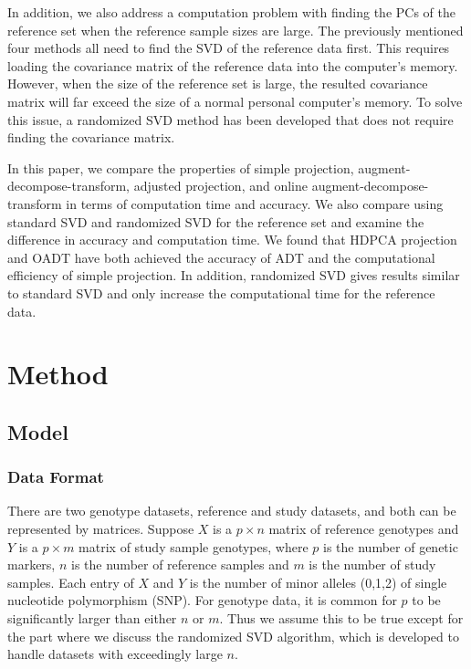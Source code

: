 \documentclass{article}
\begin{document}
In addition, we also address a computation problem with finding the PCs of the reference set when the reference sample sizes are large. 
The previously mentioned four methods all need to find the SVD of the reference data first.
This requires loading the covariance matrix of the reference data into the
computer's memory. 
However, when the size of the reference set is large,
the resulted covariance matrix will far exceed the size of a normal personal
computer's memory.
To solve this issue, a randomized SVD method has been developed that does not
require finding the covariance matrix.

In this paper, we compare the properties of
simple projection, augment-decompose-transform, adjusted projection, and online augment-decompose-transform
in terms of computation time and accuracy.
We also compare using standard SVD and randomized SVD for the reference set
and examine the difference in accuracy and computation time.
We found that HDPCA projection and OADT have both achieved the accuracy of ADT
and the computational efficiency of simple projection.
In addition, randomized SVD gives results similar to standard SVD and only increase the computational time for the reference data.




\section{Method}

\subsection{Model}

\subsubsection{Data Format}
There are two genotype datasets, reference and study datasets, and both can be represented by matrices.
Suppose $X$ is a $p \times n$ matrix of reference genotypes and 
$Y$ is a $p \times m$ matrix of study sample genotypes, where 
$p$ is the number of genetic markers, $n$ is the number of reference samples and $m$ is the number of study samples. Each entry of $X$ and $Y$ is the number of minor alleles (0,1,2) of single nucleotide polymorphism (SNP). 
For genotype data, it is common for $p$ to be significantly larger than either $n$ or $m$.
Thus we assume this to be true except for the part where we discuss the randomized SVD algorithm,
which is developed to handle datasets with exceedingly large $n$.
\end{document}
